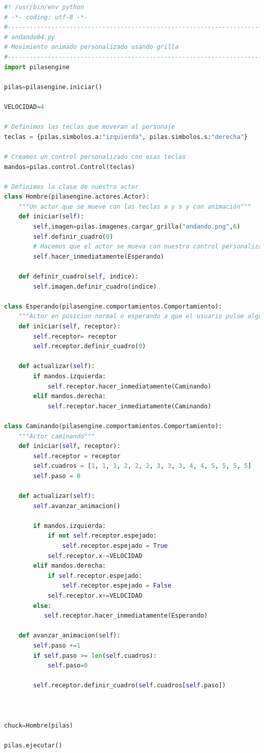 \documentclass{article}
\begin{document}
\begin{lstlisting}[language=Python]
#! /usr/bin/env python
# -*- coding: utf-8 -*-
#-----------------------------------------------------------------------
# andando04.py
# Movimiento animado personalizado usando grilla
#-----------------------------------------------------------------------
import pilasengine

pilas=pilasengine.iniciar()

VELOCIDAD=4

# Definimos las teclas que moveran al personaje
teclas = {pilas.simbolos.a:"izquierda", pilas.simbolos.s:"derecha"}

# Creamos un control personalizado con esas teclas
mandos=pilas.control.Control(teclas)

# Definimos la clase de nuestro actor
class Hombre(pilasengine.actores.Actor):
    """Un actor que se mueve con las teclas a y s y con animación"""
    def iniciar(self):
        self.imagen=pilas.imagenes.cargar_grilla("andando.png",6)
        self.definir_cuadro(0)
        # Hacemos que el actor se mueva con nuestro control personalizado
        self.hacer_inmediatamente(Esperando)
    
    def definir_cuadro(self, indice):
        self.imagen.definir_cuadro(indice)
    
class Esperando(pilasengine.comportamientos.Comportamiento):
    """Actor en posicion normal o esperando a que el usuario pulse alguna tecla"""
    def iniciar(self, receptor):
        self.receptor= receptor
        self.receptor.definir_cuadro(0)

    def actualizar(self):
        if mandos.izquierda:
            self.receptor.hacer_inmediatamente(Caminando)
        elif mandos.derecha:
            self.receptor.hacer_inmediatamente(Caminando)
        
class Caminando(pilasengine.comportamientos.Comportamiento):
    """Actor caminando"""
    def iniciar(self, receptor):
        self.receptor = receptor
        self.cuadros = [1, 1, 1, 2, 2, 2, 3, 3, 3, 4, 4, 5, 5, 5, 5]
        self.paso = 0

    def actualizar(self):
        self.avanzar_animacion()
        
        if mandos.izquierda:
            if not self.receptor.espejado:
                self.receptor.espejado = True
            self.receptor.x-=VELOCIDAD
        elif mandos.derecha:
            if self.receptor.espejado:
                self.receptor.espejado = False
            self.receptor.x+=VELOCIDAD
        else:
           self.receptor.hacer_inmediatamente(Esperando)
    
    def avanzar_animacion(self):
        self.paso +=1
        if self.paso >= len(self.cuadros):
            self.paso=0
        
        self.receptor.definir_cuadro(self.cuadros[self.paso])
                
            
        
chuck=Hombre(pilas)

pilas.ejecutar()
\end{lstlisting}
\vspace{\baselineskip}
\end{document}

